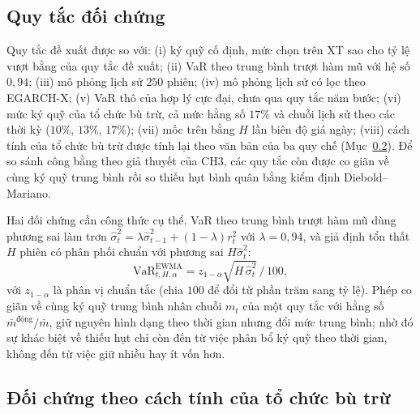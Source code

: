 \documentclass[12pt,a4paper]{article}
\theoremstyle{definition}
\theoremstyle{remark}
\newcommand{\VaR}{\mathrm{VaR}}
\newcommand{\XT}{\mathrm{XT}}
\begin{document}
\subsection{Quy tắc đối chứng}

Quy tắc đề xuất được so với: (i) ký quỹ cố định, mức chọn trên $\XT$ sao cho tỷ lệ vượt bằng của quy tắc đề xuất; (ii) VaR theo trung bình trượt hàm mũ với hệ số $0{,}94$; (iii) mô phỏng lịch sử $250$ phiên; (iv) mô phỏng lịch sử có lọc theo EGARCH-X; (v) VaR thô của hợp lý cực đại, chưa qua quy tắc năm bước; (vi) mức ký quỹ của tổ chức bù trừ, cả mức hằng số $17\%$ và chuỗi lịch sử theo các thời kỳ ($10\%$, $13\%$, $17\%$); (vii) mốc trên bằng $H$ lần biên độ giá ngày; (viii) cách tính của tổ chức bù trừ được tính lại theo văn bản của ba quy chế (Mục~\ref{sec:vsdcdoichung}). Để so sánh công bằng theo giả thuyết của CH3, các quy tắc còn được co giãn về cùng ký quỹ trung bình rồi so thiếu hụt bình quân bằng kiểm định Diebold--Mariano.

Hai đối chứng cần công thức cụ thể. VaR theo trung bình trượt hàm mũ dùng phương sai làm trơn $\hat\sigma^2_t=\lambda\hat\sigma^2_{t-1}+(1-\lambda)r_t^2$ với $\lambda=0{,}94$, và giả định tổn thất $H$ phiên có phân phối chuẩn với phương sai $H\hat\sigma^2_t$:
\begin{equation*}
\VaR^{\mathrm{EWMA}}_{t,H,\alpha}=z_{1-\alpha}\sqrt{H\,\hat\sigma^2_t}\,/\,100 ,
\end{equation*}
với $z_{1-\alpha}$ là phân vị chuẩn tắc (chia $100$ để đổi từ phần trăm sang tỷ lệ). Phép co giãn về cùng ký quỹ trung bình nhân chuỗi $m_t$ của một quy tắc với hằng số $\bar m^{\mathrm{động}}/\bar m$, giữ nguyên hình dạng theo thời gian nhưng đổi mức trung bình; nhờ đó sự khác biệt về thiếu hụt chỉ còn đến từ việc phân bổ ký quỹ theo thời gian, không đến từ việc giữ nhiều hay ít vốn hơn.

\subsection{Đối chứng theo cách tính của tổ chức bù trừ}\label{sec:vsdcdoichung}
\end{document}
